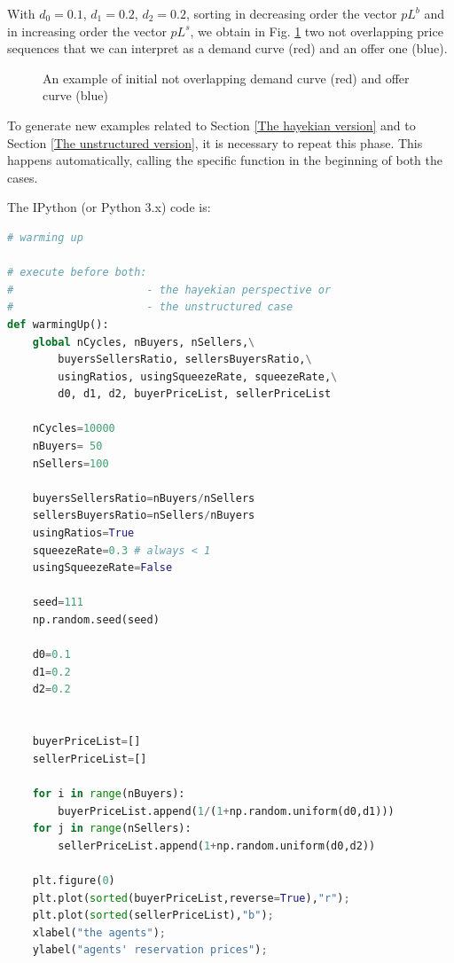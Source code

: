 \documentclass[10pt]{report}
\begin{document}
With  $d_0=0.1$, $d_1=0.2$, $d_2=0.2$, sorting in decreasing order the vector  $pL^b$ and in increasing order the vector  $pL^s$, we obtain in Fig. \ref{output_3_1.png} two not overlapping price sequences that we can interpret as a demand curve (red) and an offer one (blue).

\begin{figure}[H]
\begin{center}
\caption{An example of initial not overlapping demand curve (red) and offer curve (blue)}
\label{output_3_1.png}
\end{center}
\end{figure}

To generate new examples related to Section \ref{The hayekian version} and to Section \ref{The unstructured version}, it is necessary to repeat this phase. This happens automatically, calling the specific function in the beginning of both the cases.


The IPython (or Python 3.x) code is:

\begin{lstlisting}[language=Python, caption=Warming up of the model, basicstyle=\ttfamily\footnotesize]
# warming up

# execute before both: 
#                     - the hayekian perspective or
#                     - the unstructured case
def warmingUp():
    global nCycles, nBuyers, nSellers,\
        buyersSellersRatio, sellersBuyersRatio,\
        usingRatios, usingSqueezeRate, squeezeRate,\
        d0, d1, d2, buyerPriceList, sellerPriceList

    nCycles=10000
    nBuyers= 50
    nSellers=100

    buyersSellersRatio=nBuyers/nSellers
    sellersBuyersRatio=nSellers/nBuyers
    usingRatios=True
    squeezeRate=0.3 # always < 1 
    usingSqueezeRate=False

    seed=111
    np.random.seed(seed)

    d0=0.1
    d1=0.2
    d2=0.2


    buyerPriceList=[]
    sellerPriceList=[]

    for i in range(nBuyers):
        buyerPriceList.append(1/(1+np.random.uniform(d0,d1)))
    for j in range(nSellers):
        sellerPriceList.append(1+np.random.uniform(d0,d2))
    
    plt.figure(0)
    plt.plot(sorted(buyerPriceList,reverse=True),"r");
    plt.plot(sorted(sellerPriceList),"b");
    xlabel("the agents");
    ylabel("agents' reservation prices");
\end{lstlisting}
\end{document}
